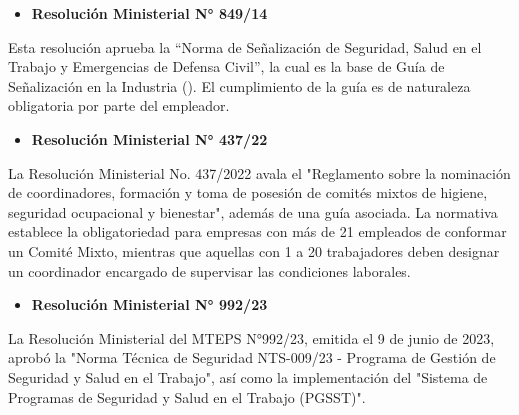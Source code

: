 \begin{samepage}
\begin{itemize} [wide=0pt, topsep=0pt] \item \textbf{Resolución Ministerial N° 849/14} \end{itemize} 

\indent
Esta resolución aprueba la ``Norma de Señalización de Seguridad, Salud en el Trabajo y Emergencias de
Defensa Civil'', la cual es la base de Guía de Señalización en la Industria (\cite{guiaSeñalizacion}). El cumplimiento de la guía es de naturaleza obligatoria por parte del empleador.
\end{samepage}

\begin{samepage}
\begin{itemize} [wide=0pt, topsep=0pt] \item \textbf{Resolución Ministerial N° 437/22} \end{itemize} 

\indent
La Resolución Ministerial No. 437/2022 avala el "Reglamento sobre la nominación de coordinadores, formación y toma de posesión de comités mixtos de higiene, seguridad ocupacional y bienestar", además de una guía asociada. La normativa establece la obligatoriedad para empresas con más de 21 empleados de conformar un Comité Mixto, mientras que aquellas con 1 a 20 trabajadores deben designar un coordinador encargado de supervisar las condiciones laborales.
\end{samepage}

\begin{samepage}
\begin{itemize} [wide=0pt, topsep=0pt] \item \textbf{Resolución Ministerial N° 992/23} \end{itemize} 

\indent
La Resolución Ministerial del MTEPS N°992/23, emitida el 9 de junio de 2023, aprobó la "Norma Técnica de Seguridad NTS-009/23 - Programa de Gestión de Seguridad y Salud en el Trabajo", así como la implementación del "Sistema de Programas de Seguridad y Salud en el Trabajo (PGSST)". 
\end{samepage}

